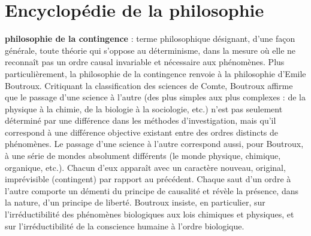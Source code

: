 
\section{Encyclopédie de la philosophie}
{\bf philosophie de la contingence} : terme philosophique désignant, d’une façon
générale, toute théorie qui s'oppose au
déterminisme, dans la mesure où elle ne
reconnaît pas un ordre causal invariable
et nécessaire aux phénomènes. Plus particulièrement, la philosophie de la contingence renvoie à la philosophie d'Emile
Boutroux. Critiquant la classification des
sciences de Comte, Boutroux affirme que
le passage d’une science à l’autre (des
plus simples aux plus complexes : de la
physique à la chimie, de la biologie à la
sociologie, etc.) n’est pas seulement déterminé par une différence dans les
méthodes d'investigation, mais qu'il correspond à une différence objective existant entre des ordres distincts de
phénomènes. Le passage d’une science à
l’autre correspond aussi, pour Boutroux,
à une série de mondes absolument différents (le monde physique, chimique, organique, etc.). Chacun d’eux apparaît avec
un caractère nouveau, original, imprévisible (contingent) par rapport au précédent. Chaque saut d’un ordre à l’autre
comporte un démenti du principe de causalité et révèle la présence, dans la nature,
d’un principe de liberté. Boutroux insiste,
en particulier, sur l’irréductibilité des phénomènes biologiques aux lois chimiques
et physiques, et sur l’irréductibilité de la
conscience humaine à l’ordre biologique.



